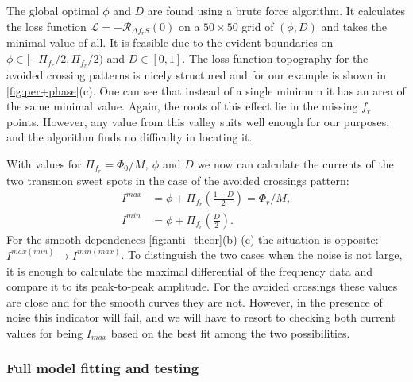 \documentclass[%
 aip,
 amsmath,amssymb,
 reprint,%
]{revtex4-1}
\begin{document}
The global optimal $\phi$ and $D$ are found using a brute force algorithm. It calculates the loss function $\mathcal{L} = - \mathcal{R}_{\Delta f_r S}(0)$ on a $50 \times 50$ grid of $(\phi, D)$ and takes the minimal value of all. It is feasible due to the evident boundaries on $\phi \in [-\Pi_{f_r}/2,\Pi_{f_r}/2)$ and $D \in [0, 1]$. The loss function topography for the avoided crossing patterns is nicely structured and for our example is shown in \autoref{fig:per+phase}(c). One can see that instead of a single minimum it has an area of the same minimal value. Again, the roots of this effect lie in the missing $f_r$ points. However, any value from this valley suits well enough for our purposes, and the algorithm finds no difficulty in locating it.

With values for $\Pi_{f_r} = \Phi_0/M,\ \phi$ and $D$ we now can calculate the currents of the two transmon sweet spots in the case of the avoided crossings pattern:
\begin{align}
I^{max} &= \phi + \Pi_{f_r} \left(\frac{1+D}{2}\right) = \Phi_r /M ,\\
I^{min} &= \phi + \Pi_{f_r} \left(\frac{D}{2}\right).
\end{align}
For the smooth dependences \autoref{fig:anti_theor}(b)-(c) the situation is opposite: $I^{max(min)} \rightarrow I^{min(max)}$. To distinguish the two cases when the noise is not large, it is enough to calculate the maximal differential of the frequency data and compare it to its peak-to-peak amplitude. For the avoided crossings these values are close and for the smooth curves they are not. However, in the presence of noise this indicator will fail, and we will have to resort to checking both current values for being $I_{max}$ based on the best fit among the two possibilities.


\subsubsection{Full model fitting and testing}
\end{document}
